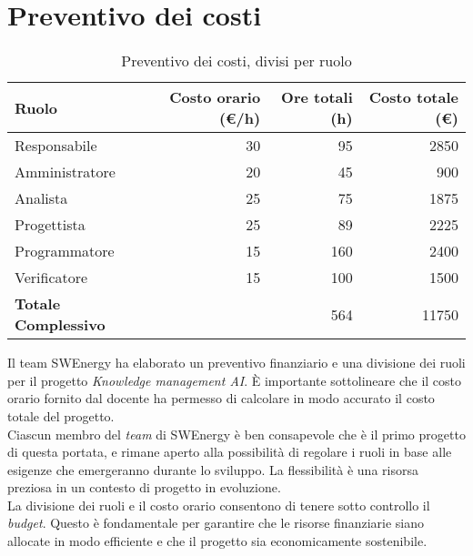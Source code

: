 \section{Preventivo dei costi}

\begin{table}[H]
	\renewcommand{\arraystretch}{1.5}
	\centering
	\begin{tabular}{l|r|r|r}
		\textbf{Ruolo} & \textbf{Costo orario (€/h)} & \textbf{Ore totali (h)} & 
		\textbf{Costo totale (€)} \\
		\hline
		Responsabile				&	 30 &  95 &	 2850			\\
		Amministratore				&	 20 &  45 &   900  			\\
		Analista					&	 25 &  75 &  1875			\\
		Progettista					&	 25 &  89 &  2225			\\
		Programmatore				&	 15 & 160 &  2400			\\
		Verificatore				&	 15 & 100 &  1500			\\
		\hline
		\textbf{Totale Complessivo} &		& 564 &	11750			\\
	\end{tabular}
	\caption{Preventivo dei costi, divisi per ruolo}

\end{table}

Il team SWEnergy ha elaborato un preventivo finanziario e una divisione dei
ruoli per il progetto \textit{Knowledge management AI}. È importante 
sottolineare che il costo orario fornito dal docente ha permesso di calcolare 
in modo accurato il costo totale del progetto. \\

\noindent
Ciascun membro del \textit{team} di SWEnergy è ben consapevole che è il primo
progetto di questa portata, e 
rimane aperto alla possibilità di regolare i ruoli in base alle esigenze che 
emergeranno durante lo sviluppo. La flessibilità è una risorsa preziosa in un 
contesto di progetto in evoluzione. \\
La divisione dei ruoli e il costo orario consentono di tenere sotto controllo il
\textit{budget}. Questo è fondamentale per garantire che le risorse finanziarie siano 
allocate in modo efficiente e che il progetto sia economicamente sostenibile.
